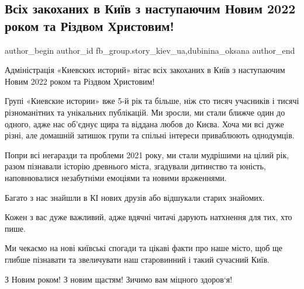  
 
 
 
 
 
\subsection{Всіх закоханих в Київ з наступаючим Новим 2022 роком та Різдвом Христовим!}
\label{sec:30_12_2021.fb.fb_group.story_kiev_ua.2.pozdravlenie_novyj_god_rizdvo}
 
\ifcmt
 author_begin
   author_id fb_group.story_kiev_ua,dubinina_oksana
 author_end
\fi


Адміністрація «Киевских историй» вітає всіх закоханих в Київ з наступаючим
Новим 2022 роком та Різдвом Христовим!

Групі «Киевские истории» вже 5-й рік та більше, ніж сто тисяч учасників і
тисячі різноманітних та унікальних публікацій. Ми зросли, ми стали ближче один
до одного, адже нас об’єднує щира та віддана любов до Києва. Хоча ми всі дуже
різні, але домашній затишок групи та спільні інтереси приваблюють однодумців. 

Попри всі негаразди та проблеми 2021 року, ми стали мудрішими на цілий рік,
разом пізнавали історію древнього міста, згадували дитинство та юність,
наповнювалися незабутніми емоціями та новими враженнями. 

Багато з нас знайшли в КІ нових друзів або відшукали старих знайомих. 

Кожен з вас дуже важливий, адже вдячні читачі дарують натхнення для тих, хто
пише. 

Ми чекаємо на нові київські спогади та цікаві факти про наше місто, щоб ще
глибше пізнавати та звеличувати наш старовинний і такий сучасний Київ.

З Новим роком! З новим щастям! Зичимо вам міцного здоров‘я!

